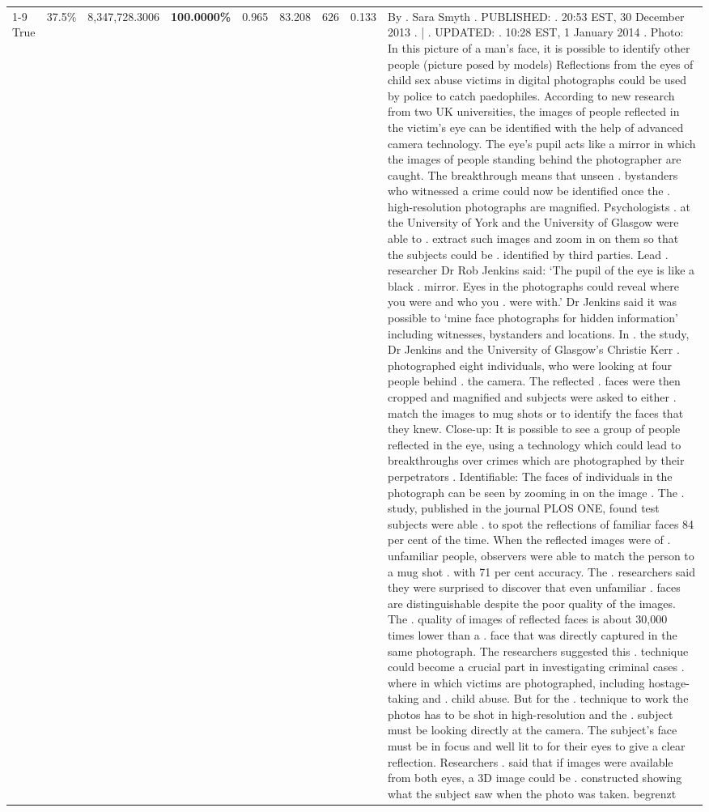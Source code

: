 \begin{table}[H]
\begin{tabular}{lllrlllll}
\cline{1-9} \cline{2-9}
True & 37.5\% & 8,347,728.3006 & \bfseries \color{red} 100.0000\% & 0.965 & 83.208 & 626 & 0.133 & By . Sara Smyth . PUBLISHED: . 20:53 EST, 30 December 2013 . | . UPDATED: . 10:28 EST, 1 January 2014 . Photo: In this picture of a man's face, it is possible to identify other people (picture posed by models) Reflections from the eyes of child sex abuse victims in digital photographs could be used by police to catch paedophiles. According to new research from two UK universities, the images of people reflected in the victim's eye can be identified with the help of advanced camera technology. The eye's pupil acts like a mirror in which the images of people standing behind the photographer are caught. The breakthrough means that unseen . bystanders who witnessed a crime could now be identified once the . high-resolution photographs are magnified. Psychologists . at the University of York and the University of Glasgow were able to . extract such images and zoom in on them so that the subjects could be . identified by third parties. Lead . researcher Dr Rob Jenkins said: ‘The pupil of the eye is like a black . mirror. Eyes in the photographs could reveal where you were and who you . were with.' Dr Jenkins said it was possible to ‘mine face photographs for hidden information' including witnesses, bystanders and locations. In . the study, Dr Jenkins and the University of Glasgow's Christie Kerr . photographed eight individuals, who were looking at four people behind . the camera. The reflected . faces were then cropped and magnified and subjects were asked to either . match the images to mug shots or to identify the faces that they knew. Close-up: It is possible to see a group of people reflected in the eye, using a technology which could lead to breakthroughs over crimes which are photographed by their perpetrators . Identifiable: The faces of individuals in the photograph can be seen by zooming in on the image . The . study, published in the journal PLOS ONE, found test subjects were able . to spot the reflections of familiar faces 84 per cent of the time. When the reflected images were of . unfamiliar people, observers were able to match the person to a mug shot . with 71 per cent accuracy. The . researchers said they were surprised to discover that even unfamiliar . faces are distinguishable despite the poor quality of the images. The . quality of images of reflected faces is about 30,000 times lower than a . face that was directly captured in the same photograph. The researchers suggested this . technique could become a crucial part in investigating criminal cases . where in which victims are photographed, including hostage-taking and . child abuse. But for the . technique to work the photos has to be shot in high-resolution and the . subject must be looking directly at the camera. The subject's face must be in focus and well lit to for their eyes to give a clear reflection. Researchers . said that if images were available from both eyes, a 3D image could be . constructed showing what the subject saw when the photo was taken. begrenzt \\

\end{tabular}
\end{table}
